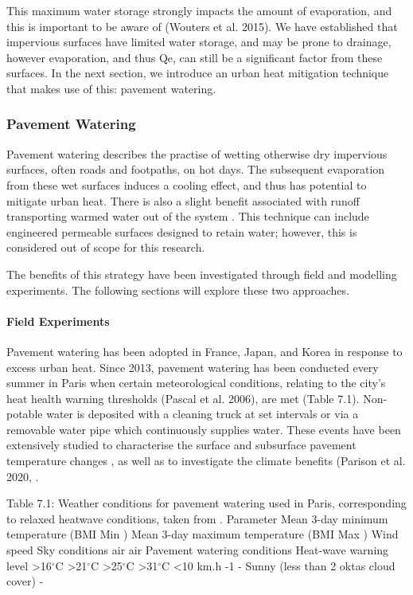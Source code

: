 \documentclass[final,3p,times,authoryear]{elsarticle}
\begin{document}
This maximum water storage strongly impacts the amount of evaporation, and this is
important to be aware of (Wouters et al. 2015).
We have established that impervious surfaces have limited water storage, and may be
prone to drainage, however evaporation, and thus \gls{Qe}, can still be a significant factor from these surfaces. In the next section, we introduce an urban heat mitigation
technique that makes use of this: pavement watering.

\subsubsection{Pavement Watering}\label{sec:appendix7.1.4_}

Pavement watering describes the practise of wetting otherwise dry impervious surfaces,
often roads and footpaths, on hot days. The subsequent evaporation from these wet
surfaces induces a cooling effect, and thus has potential to mitigate urban heat. There is
also a slight benefit associated with runoff transporting warmed water out of the system
\citep{Hendel2020}. This technique can include engineered permeable surfaces
designed to retain water; however, this is considered out of scope for this research. 

The benefits of this strategy have been investigated through field and modelling
experiments. The following sections will explore these two approaches.

\paragraph{Field Experiments}\label{sec:appendix7.1.4.1}

Pavement watering has been adopted in France, Japan, and Korea in response to excess
urban heat.
Since 2013, pavement watering has been conducted every summer in Paris when certain
meteorological conditions, relating to the city's heat health warning thresholds (Pascal et
al. 2006), are met (Table 7.1). Non-potable water is deposited with a cleaning truck at
set intervals or via a removable water pipe which continuously supplies water. These events have been extensively studied to characterise the surface and subsurface
pavement temperature changes \cite{Hendel2015,Hendel2015a,Hendel2015b,Hendel2014}, as well as to investigate the climate benefits (Parison et al. 2020, \cite{Hendel2016}.


Table 7.1: Weather conditions for pavement watering used in Paris, corresponding to relaxed heatwave
conditions, taken from \cite{Hendel2015a}.
Parameter
Mean 3-day minimum
temperature (BMI Min )
Mean 3-day maximum
temperature (BMI Max )
Wind speed
Sky conditions
air
air
Pavement watering
conditions Heat-wave
warning level
>16$^{\circ}$C >21$^{\circ}$C
>25$^{\circ}$C >31$^{\circ}$C
<10 km.h -1 -
Sunny (less than 2 oktas
cloud cover) -
\end{document}
